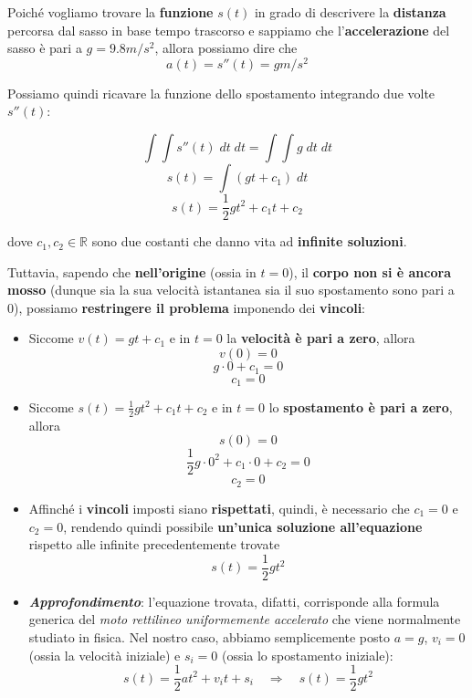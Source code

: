 \documentclass[a4paper, 12pt]{report}
\begin{document}
    \quad
    
    Poiché vogliamo trovare la \textbf{funzione} $s(t)$ in grado di descrivere la \textbf{distanza} percorsa dal sasso in base tempo trascorso e sappiamo che l'\textbf{accelerazione} del sasso è pari a $g = 9.8 m/s^2$, allora possiamo dire che
    \[ a(t) = s''(t) = g m/s^2\]
    
    Possiamo quindi ricavare la funzione dello spostamento integrando due volte $s''(t)$:
    
    \[ \int \int s''(t) \; dt \; dt= \int \int g \; dt \; dt\]
    \[ s(t) = \int (gt+c_1) \; dt\]
    \[ s(t) = \frac{1}{2}gt^2 + c_1t +c_2\]
    
    dove $c_1, c_2 \in \mathbb{R}$ sono due costanti che danno vita ad \textbf{infinite soluzioni}.
    
    Tuttavia, sapendo che \textbf{nell'origine} (ossia in $t = 0$), il \textbf{corpo non si è ancora mosso} (dunque sia la sua velocità istantanea sia il suo spostamento sono pari a 0), possiamo \textbf{restringere il problema} imponendo dei \textbf{vincoli}:
    \begin{itemize}
        \item Siccome $v(t) = gt+c_1$ e in $t=0$ la \textbf{velocità è pari a zero}, allora 
        \[ v(0) = 0 \]
        \[ g \cdot 0 +c_1 = 0\]
        \[ c_1 = 0 \]
        
        \item Siccome $s(t) = \frac{1}{2}gt^2 + c_1t +c_2$ e in $t=0$ lo \textbf{spostamento è pari a zero}, allora 
        \[ s(0) = 0 \]
        \[ \frac{1}{2}g \cdot 0^2 + c_1 \cdot 0 +c_2 = 0\]
        \[ c_2 = 0 \]
        
        \item Affinché i \textbf{vincoli} imposti siano \textbf{rispettati}, quindi, è necessario che $c_1 = 0$ e $c_2 = 0$, rendendo quindi possibile \textbf{un'unica soluzione all'equazione} rispetto alle infinite precedentemente trovate
        \[ s(t) = \frac{1}{2}gt^2 \]
        
        \item \textit{\textbf{Approfondimento}}: l'equazione trovata, difatti, corrisponde alla formula generica del \textit{ moto rettilineo uniformemente accelerato} che viene normalmente studiato in fisica. Nel nostro caso, abbiamo semplicemente posto $a = g$, $v_i = 0$ (ossia la velocità iniziale) e $s_i = 0$ (ossia lo spostamento iniziale):
        \[ s(t) = \frac{1}{2}at^2+v_it+s_i \quad \Longrightarrow \quad s(t) = \frac{1}{2}gt^2\]
    \end{itemize}
    
\end{document}
